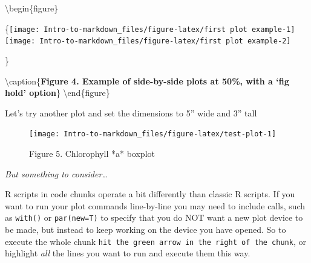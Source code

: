 \documentclass[
]{article}
\newenvironment{Shaded}{\begin{snugshade}}{\end{snugshade}}
\newcommand{\AttributeTok}[1]{\textcolor[rgb]{0.77,0.63,0.00}{#1}}
\newcommand{\DecValTok}[1]{\textcolor[rgb]{0.00,0.00,0.81}{#1}}
\newcommand{\FunctionTok}[1]{\textcolor[rgb]{0.00,0.00,0.00}{#1}}
\newcommand{\NormalTok}[1]{#1}
\newcommand{\SpecialCharTok}[1]{\textcolor[rgb]{0.00,0.00,0.00}{#1}}
\newcommand{\StringTok}[1]{\textcolor[rgb]{0.31,0.60,0.02}{#1}}
\begin{document}
\textbackslash begin\{figure\}

\{\centering \texttt{[image: Intro-to-markdown\_files/figure-latex/first plot example-1]}
\texttt{[image: Intro-to-markdown\_files/figure-latex/first plot example-2]}

\}

\textbackslash caption\{\textbf{Figure 4. Example of side-by-side plots
at 50\%, with a `fig hold' option}\}\label{fig:first plot example}
\textbackslash end\{figure\}

Let's try another plot and set the dimensions to 5'' wide and 3'' tall

\begin{Shaded}
\end{Shaded}

\begin{figure}

{\centering \texttt{[image: Intro-to-markdown\_files/figure-latex/test-plot-1]} 

}

\caption{Figure 5. Chlorophyll *a* boxplot}\label{fig:test-plot}
\end{figure}

\emph{But something to consider\ldots{}}

R scripts in code chunks operate a bit differently than classic R
scripts. If you want to run your plot commands line-by-line you may need
to include calls, such as \texttt{with()} or \texttt{par(new=T)} to
specify that you do NOT want a new plot device to be made, but instead
to keep working on the device you have opened. So to execute the whole
chunk \texttt{hit\ the\ green\ arrow\ in\ the\ right\ of\ the\ chunk},
or highlight \emph{all} the lines you want to run and execute them this
way.
\end{document}
